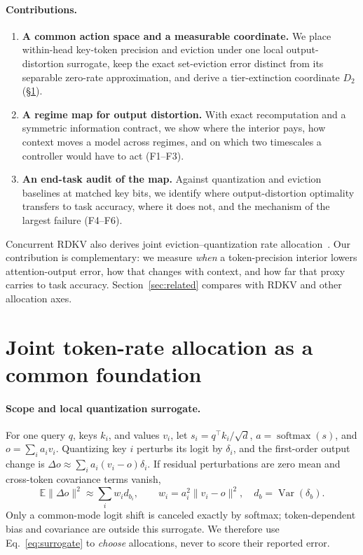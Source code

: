 \documentclass{article}
\theoremstyle{definition}
\begin{document}
\paragraph{Contributions.}
\begin{enumerate}[leftmargin=*,itemsep=1pt,topsep=2pt]
  \item \textbf{A common action space and a measurable coordinate.} We place within-head key-token precision and eviction under one local output-distortion surrogate, keep the exact set-eviction error distinct from its separable zero-rate approximation, and derive a tier-extinction coordinate $D_2$ (\S\ref{sec:framework}).
  \item \textbf{A regime map for output distortion.} With exact recomputation and a symmetric information contract, we show where the interior pays, how context moves a model across regimes, and on which two timescales a controller would have to act (F1--F3).
  \item \textbf{An end-task audit of the map.} Against quantization and eviction baselines at matched key bits, we identify where output-distortion optimality transfers to task accuracy, where it does not, and the mechanism of the largest failure (F4--F6).
\end{enumerate}

Concurrent RDKV also derives joint eviction--quantization rate allocation~\citep{zhang2026rdkv}.  Our contribution is complementary: we measure \emph{when} a token-precision interior lowers attention-output error, how that changes with context, and how far that proxy carries to task accuracy.  Section~\ref{sec:related} compares with RDKV and other allocation axes.

\section{Joint token-rate allocation as a common foundation}
\label{sec:framework}

\paragraph{Scope and local quantization surrogate.}
For one query $q$, keys $k_i$, and values $v_i$, let
$s_i=q^\top k_i/\sqrt d$, $a=\operatorname{softmax}(s)$, and
$o=\sum_i a_i v_i$.  Quantizing key $i$ perturbs its logit by $\delta_i$, and the first-order output change is $\Delta o \approx \sum_i a_i(v_i-o)\delta_i$.
If residual perturbations are zero mean and cross-token covariance terms vanish,
\begin{equation}
  \mathbb E\|\Delta o\|^2
  \approx \sum_i w_i d_{b_i}, \qquad
  w_i=a_i^2\|v_i-o\|^2,\quad d_b=\operatorname{Var}(\delta_b).
  \label{eq:surrogate}
\end{equation}
Only a common-mode logit shift is canceled exactly by softmax; token-dependent bias and covariance are outside this surrogate.  We therefore use Eq.~\ref{eq:surrogate} to \emph{choose} allocations, never to score their reported error.
\end{document}
